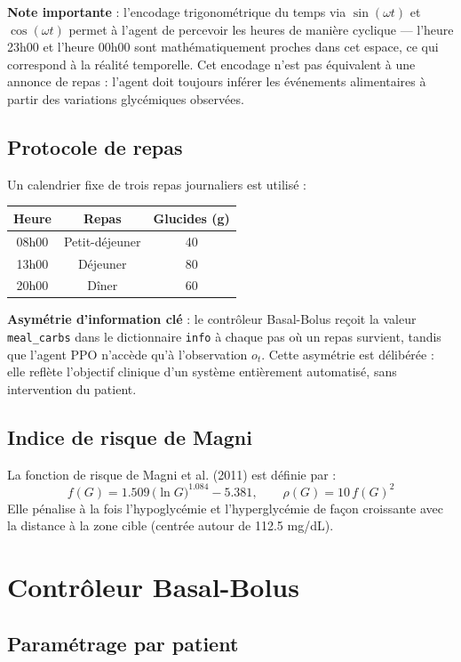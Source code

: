 \documentclass[a4paper,12pt]{report}
\begin{document}
\textbf{Note importante} : l'encodage trigonométrique du temps via $\sin(\omega t)$ et $\cos(\omega t)$ permet à l'agent de percevoir les heures de manière cyclique --- l'heure 23h00 et l'heure 00h00 sont mathématiquement proches dans cet espace, ce qui correspond à la réalité temporelle. Cet encodage n'est pas équivalent à une annonce de repas : l'agent doit toujours inférer les événements alimentaires à partir des variations glycémiques observées.

\subsection{Protocole de repas}

Un calendrier fixe de trois repas journaliers est utilisé :
\begin{center}
\begin{tabular}{ccc}
\toprule
\textbf{Heure} & \textbf{Repas} & \textbf{Glucides (g)} \\
\midrule
08h00 & Petit-déjeuner & 40 \\
13h00 & Déjeuner & 80 \\
20h00 & Dîner & 60 \\
\bottomrule
\end{tabular}
\end{center}

\textbf{Asymétrie d'information clé} : le contrôleur Basal-Bolus reçoit la valeur \texttt{meal\_carbs} dans le dictionnaire \texttt{info} à chaque pas où un repas survient, tandis que l'agent PPO n'accède qu'à l'observation $o_t$. Cette asymétrie est délibérée : elle reflète l'objectif clinique d'un système entièrement automatisé, sans intervention du patient.

\subsection{Indice de risque de Magni}

La fonction de risque de Magni et al. (2011) est définie par :
\[
  f(G) = 1.509\,\bigl(\ln G\bigr)^{1.084} - 5.381, \qquad
  \rho(G) = 10\, f(G)^2
\]
Elle pénalise à la fois l'hypoglycémie et l'hyperglycémie de façon croissante avec la distance à la zone cible (centrée autour de 112.5 mg/dL).

\section{Contrôleur Basal-Bolus}

\subsection{Paramétrage par patient}
\end{document}
